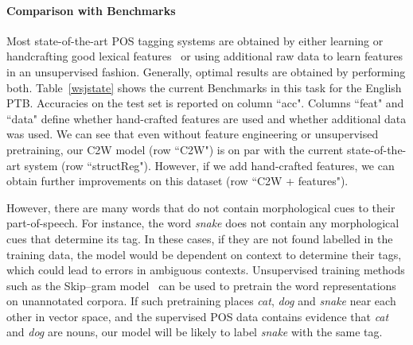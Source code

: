 \documentclass[11pt]{article}
\begin{document}
\begin{CJK*}{UTF8}{gbsn}
\begin{table}
\begin{center}
\end{center}
\caption{\label{lang} POS accuracies on different languages}
\end{table}

\paragraph{Comparison with Benchmarks}

Most state-of-the-art POS tagging systems are obtained by either learning or handcrafting good lexical features~\cite{Manning:2011:PT9:1964799.1964816,DBLP:journals/corr/Sun14c} or using additional raw data to learn features in an unsupervised fashion. Generally, optimal results are obtained by performing both. Table~\ref{wsjstate} shows the current Benchmarks in this task for the English PTB. Accuracies on the test set is reported on column ``acc". Columns ``feat" and ``data" define whether hand-crafted features are used and whether additional data was used. We can see that even without feature engineering or unsupervised pretraining, our C2W model (row ``C2W") is on par with the current state-of-the-art system (row ``structReg"). However, if we add hand-crafted features, we can obtain further improvements on this dataset (row ``C2W + features"). 

However, there are many words that do not contain morphological cues to their part-of-speech. For instance, the word \emph{snake} does not contain any morphological cues that determine its tag. In these cases, if they are not found labelled in the training data, the model would be dependent on context to determine their tags, which could lead to errors in ambiguous contexts. Unsupervised training methods such as the Skip--gram model~\cite{mikolov2013distributed} can be used to pretrain the word representations on unannotated corpora. If such pretraining places \emph{cat}, \emph{dog} and \emph{snake} near each other in vector space, and the supervised POS data contains evidence that \emph{cat} and \emph{dog} are nouns, our model will be likely to label \emph{snake} with the same tag.


\end{CJK*}
\end{document}
